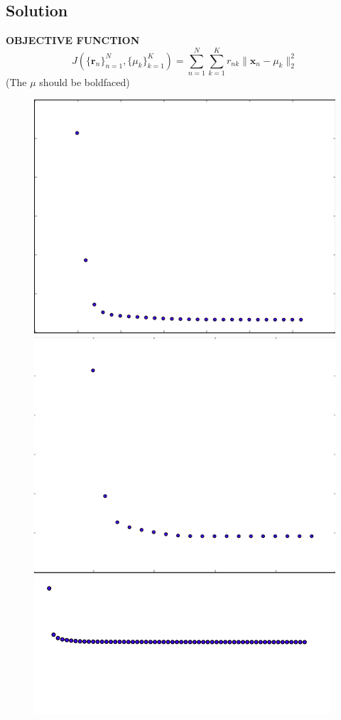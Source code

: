 \documentclass[submit]{harvardml}
\begin{document}
\subsection*{Solution}
\textbf{OBJECTIVE FUNCTION} 
	$$ J\left(\{\mathbf{r}_n\}^N_{n=1}, \{{\mu}_k\}^K_{k=1}\right) = \sum^N_{n=1} \sum^K_{k=1}
	r_{nk} \|\mathbf{x}_n - {\mu}_k\|^2_2$$
(The $\mu$ should be boldfaced)	
\begin{figure}[h]
	\includegraphics[scale=0.3]{./o/obj1} 
	\includegraphics[scale=0.3]{./o/obj4} 
	\includegraphics[scale=0.3]{./o/obj5} 
\end{figure}
\end{document}
